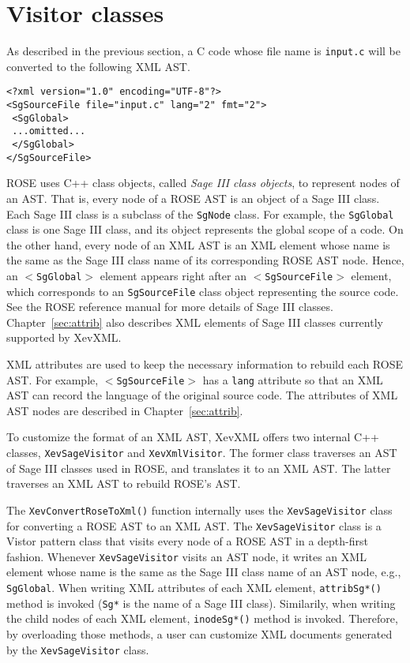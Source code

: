 \section{Visitor classes}

As described in the previous section, a C code whose file name is
\texttt{input.c} will be converted to the following XML AST.
\vspace{5mm}
\begin{verbatim}
<?xml version="1.0" encoding="UTF-8"?>
<SgSourceFile file="input.c" lang="2" fmt="2">
 <SgGlobal>
 ...omitted...
 </SgGlobal>
</SgSourceFile>
\end{verbatim}
\vspace{5mm}
ROSE uses C++ class objects, called \emph{Sage III class objects}, to
represent nodes of an AST.  That is, every node of a ROSE AST is an
object of a Sage III class. Each Sage III class is a subclass of the
\texttt{SgNode} class.  For example, the \texttt{SgGlobal} class is one
Sage III class, and its object represents the global scope of a code.
On the other hand, every node of an XML AST is an XML element whose name
is the same as the Sage III class name of its corresponding ROSE AST
node.  Hence, an \texttt{$<$SgGlobal$>$} element appears right after an
\texttt{$<$SgSourceFile$>$} element, which corresponds to an
\texttt{SgSourceFile} class object representing the source code.  See
the ROSE reference manual\cite{rose} for more details of Sage III
classes. Chapter~\ref{sec:attrib} also describes XML elements of Sage
III classes currently supported by XevXML.

XML attributes are used to keep the necessary information to rebuild
each ROSE AST. For example, \texttt{$<$SgSourceFile$>$} has a
\texttt{lang} attribute so that an XML AST can record the language of
the original source code.  The attributes of XML AST nodes are described
in Chapter~\ref{sec:attrib}.

To customize the format of an XML AST, XevXML offers two internal C++
classes, \texttt{XevSageVisitor} and \texttt{XevXmlVisitor}.  The former
class traverses an AST of Sage III classes used in ROSE, and translates
it to an XML AST.  The latter traverses an XML AST to rebuild ROSE's
AST.

The \texttt{XevConvertRoseToXml()} function internally uses the
\texttt{XevSageVisitor} class for converting a ROSE AST to an XML AST.
The \texttt{XevSageVisitor} class is a Vistor pattern class that visits
every node of a ROSE AST in a depth-first fashion. Whenever
\texttt{XevSageVisitor} visits an AST node, it writes an XML element
whose name is the same as the Sage III class name of an AST node, e.g.,
\texttt{SgGlobal}.  When writing XML attributes of each XML element,
\texttt{attribSg*()} method is invoked (\texttt{Sg*} is the name of a
Sage III class). Similarily, when writing the child nodes of each XML
element, \texttt{inodeSg*()} method is invoked.  Therefore, by
overloading those methods, a user can customize XML documents generated
by the \texttt{XevSageVisitor} class.

